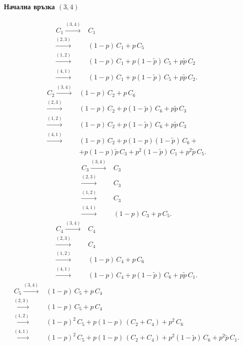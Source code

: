 \documentclass[a4paper,10pt]{article}
\begin{document}
\paragraph{Начална връзка $(3,4)$}
\begin{equation}
\begin{split}
C_1 \xrightarrow{(3,4)}& C_1\\
    \xrightarrow{(2,3)}& (1-p)\,C_1 + p\,C_5\\
    \xrightarrow{(1,2)}& (1-p)\,C_1 + p(1-\tilde{p})\,C_5 + p\tilde{p}\,C_2\\
    \xrightarrow{(4,1)}& (1-p)\,C_1 + p(1-\tilde{p})\,C_5 + p\tilde{p}\,C_2.
\end{split}
\end{equation}
%
\begin{equation}
\begin{split}
C_2 \xrightarrow{(3,4)}& (1-p)\,C_2 + p\,C_6\\
    \xrightarrow{(2,3)}& (1-p)\,C_2 + p(1-\tilde{p})\,C_6 + p\tilde{p}\,C_3\\
    \xrightarrow{(1,2)}& (1-p)\,C_2 + p(1-\tilde{p})\,C_6 + p\tilde{p}\,C_3\\
    \xrightarrow{(4,1)}& (1-p)\,C_2 + p(1-p)(1-\tilde{p})\,C_6 + \\
    & + p(1-p)\tilde{p}\,C_3 + p^2(1-\tilde{p})\,C_1 + p^2\tilde{p}\,C_5.
\end{split}
\end{equation}
%
\begin{equation}
\begin{split}
C_3 \xrightarrow{(3,4)}& C_3\\
    \xrightarrow{(2,3)}& C_3\\
    \xrightarrow{(1,2)}& C_3\\
    \xrightarrow{(4,1)}& (1-p)\,C_3 + p\,C_5.
\end{split}
\end{equation}
%
\begin{equation}
\begin{split}
C_4 \xrightarrow{(3,4)}& C_4\\
    \xrightarrow{(2,3)}& C_4\\
    \xrightarrow{(1,2)}& (1-p)\,C_4 + p\,C_6\\
    \xrightarrow{(4,1)}& (1-p)\,C_4 + p(1-\tilde{p})\,C_6 + p\tilde{p}\,C_1.
\end{split}
\end{equation}
%
\begin{equation}
\begin{split}
C_5 \xrightarrow{(3,4)}& (1-p)\,C_5 + p\,C_4\\
    \xrightarrow{(2,3)}& (1-p)\,C_5 + p\,C_4\\
    \xrightarrow{(1,2)}& (1-p)^2\,C_5 + p(1-p)\,(C_2 + C_4) + p^2\, C_6\\
    \xrightarrow{(4,1)}& (1-p)^2\,C_5 + p(1-p)\,(C_2 + C_4) + p^2(1-\tilde{p})\,C_6 + p^2\tilde{p}\,C_1.
\end{split}
\end{equation}
\end{document}
